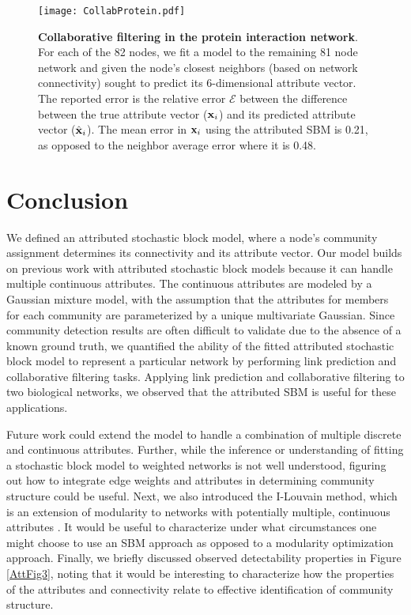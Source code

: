 \begin{figure}[h!]
\begin{center}
\texttt{[image: CollabProtein.pdf]}
\caption{{\bf Collaborative filtering in the protein interaction network}. For each of the 82 nodes, we fit a model to the remaining 81 node network and given the node's closest  neighbors (based on network connectivity) sought to predict its 6-dimensional attribute vector. The reported error is the relative error $\mathcal{E}$ between the difference between the true attribute vector (${\bf x}_{i}$) and its predicted attribute vector (${\hat{\bf x}}_{i}$). The mean error in ${\bf x}_{i}$ using the attributed SBM is 0.21, as opposed to the neighbor average error where it is 0.48. }
\label{collabprotein}
\end{center}
\end{figure}

\section{Conclusion}
We defined an attributed stochastic block model, where a node's community assignment determines its connectivity and its attribute vector. Our model builds on previous work with attributed stochastic block models because it can handle multiple continuous attributes. The continuous attributes are modeled by a Gaussian mixture model, with the assumption that the attributes for members for each community are parameterized by a unique multivariate Gaussian. Since community detection results are often difficult to validate due to the absence of a known ground truth, we quantified the ability of the fitted attributed stochastic block model to represent a particular network by performing link prediction and collaborative filtering tasks. Applying link prediction and collaborative filtering to two biological networks, we observed that the attributed SBM is useful for these applications.

Future work could extend the model to handle a combination of multiple discrete and continuous attributes. Further, while the inference or understanding of fitting a stochastic block model to weighted networks is not well understood, figuring out how to integrate edge weights and attributes in determining community structure could be useful. Next, we also introduced the I-Louvain method, which is an extension of modularity to networks with potentially multiple, continuous attributes \cite{ilouvain}. It would be useful to characterize under what circumstances one might choose to use an SBM approach as opposed to a modularity optimization approach. Finally, we briefly discussed observed detectability properties in Figure \ref{AttFig3}, noting that it would be interesting to characterize how the properties of the attributes and connectivity relate to effective identification of community structure.

